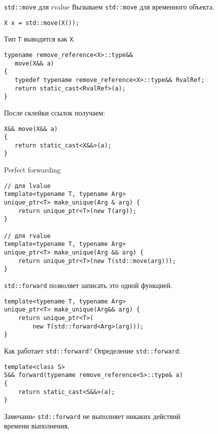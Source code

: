 \documentclass{beamer}
\begin{document}
\begin{frame}[fragile]{{\tt std::move} для rvalue}
Вызываем \texttt{std::move} для временного объекта.
\begin{lstlisting}
X x = std::move(X());
\end{lstlisting}
Тип \texttt{T} выводится как \texttt{X}.
    \begin{lstlisting}
typename remove_reference<X>::type&&
   move(X&& a) 
{
   typedef typename remove_reference<X>::type&& RvalRef;
   return static_cast<RvalRef>(a);
} 
    \end{lstlisting}
После склейки ссылок получаем:
    \begin{lstlisting}
X&& move(X&& a) 
{
   return static_cast<X&&>(a);
} 
    \end{lstlisting}

\end{frame}


\begin{frame}[fragile]{Perfect forwarding}
    \begin{lstlisting}
// для lvalue
template<typename T, typename Arg> 
unique_ptr<T> make_unique(Arg & arg) { 
    return unique_ptr<T>(new T(arg));
} 

// для rvalue
template<typename T, typename Arg> 
unique_ptr<T> make_unique(Arg && arg) { 
    return unique_ptr<T>(new T(std::move(arg)));
} 
    \end{lstlisting}

\texttt{std::forward} позволяет записать это одной функцией.
    \begin{lstlisting}
template<typename T, typename Arg> 
unique_ptr<T> make_unique(Arg&& arg) { 
    return unique_ptr<T>(
        new T(std::forward<Arg>(arg)));
} 
    \end{lstlisting}
\end{frame}

\begin{frame}[fragile]{Как работает \texttt{std::forward}?}
Определение \texttt{std::forward}:
    \begin{lstlisting}
template<class S>
S&& forward(typename remove_reference<S>::type& a) 
{
    return static_cast<S&&>(a);
} 
    \end{lstlisting}

\begin{block}{Замечаниe}
    \texttt{std::forward} не выполняет никаких действий\\
    времени выполнения.
\end{block}
\end{frame}
\end{document}
